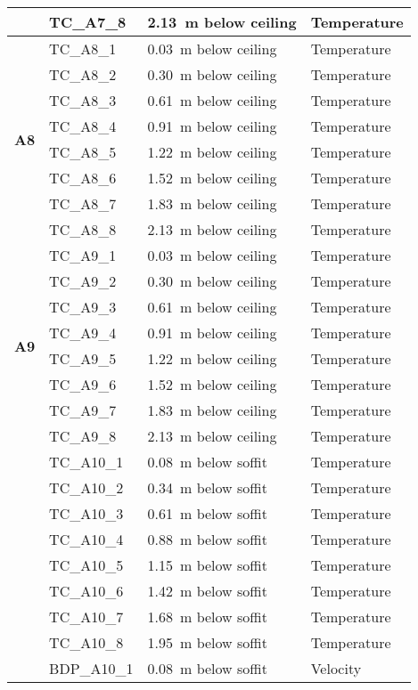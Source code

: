 \begin{longtable}[c]{c|lll}
 & TC\_A7\_8  & 2.13~m below ceiling & Temperature \\
\midrule
\multirow{8}{*}{\large{\textbf{A8}}}
 & TC\_A8\_1  & 0.03~m below ceiling & Temperature \\
 & TC\_A8\_2  & 0.30~m below ceiling & Temperature \\
 & TC\_A8\_3  & 0.61~m below ceiling & Temperature \\
 & TC\_A8\_4  & 0.91~m below ceiling & Temperature \\
 & TC\_A8\_5  & 1.22~m below ceiling & Temperature \\
 & TC\_A8\_6  & 1.52~m below ceiling & Temperature \\
 & TC\_A8\_7  & 1.83~m below ceiling & Temperature \\
 & TC\_A8\_8  & 2.13~m below ceiling & Temperature \\
\midrule
\multirow{8}{*}{\large{\textbf{A9}}}
 & TC\_A9\_1  & 0.03~m below ceiling & Temperature \\
 & TC\_A9\_2  & 0.30~m below ceiling & Temperature \\
 & TC\_A9\_3  & 0.61~m below ceiling & Temperature \\
 & TC\_A9\_4  & 0.91~m below ceiling & Temperature \\
 & TC\_A9\_5  & 1.22~m below ceiling & Temperature \\
 & TC\_A9\_6  & 1.52~m below ceiling & Temperature \\
 & TC\_A9\_7  & 1.83~m below ceiling & Temperature \\
 & TC\_A9\_8  & 2.13~m below ceiling & Temperature \\
\bottomrule
\newpage
\multirow{19}{*}{\large\textbf{A10}}
 & TC\_A10\_1  & 0.08~m below soffit  & Temperature \\
 & TC\_A10\_2  & 0.34~m below soffit  & Temperature \\
 & TC\_A10\_3  & 0.61~m below soffit  & Temperature \\
 & TC\_A10\_4  & 0.88~m below soffit  & Temperature \\
 & TC\_A10\_5  & 1.15~m below soffit  & Temperature \\
 & TC\_A10\_6  & 1.42~m below soffit  & Temperature \\
 & TC\_A10\_7  & 1.68~m below soffit  & Temperature \\
 & TC\_A10\_8  & 1.95~m below soffit  & Temperature \\
\cline{2-4}
 & BDP\_A10\_1 & 0.08~m below soffit  & Velocity \\

\end{longtable}
